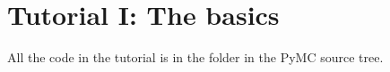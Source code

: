 \documentclass[]{manual}
\begin{document}


\chapter{Tutorial I: The basics}\label{cha:basics} %

All the code in the tutorial is in the folder  in the PyMC source tree.
\end{document}
